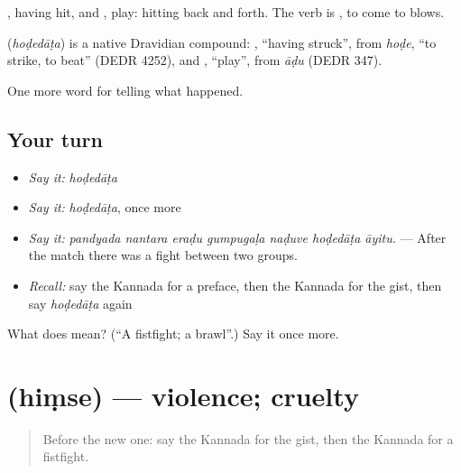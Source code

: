 , having hit, and , play: hitting back and forth. The verb is , to come to blows.

\begin{cousinweb}
\textbf{} (\emph{hoḍedāṭa}) is a native Dravidian compound: , \textquotedblleft{}having struck\textquotedblright{}, from \emph{hoḍe}, \textquotedblleft{}to strike, to beat\textquotedblright{} (DEDR 4252), and , \textquotedblleft{}play\textquotedblright{}, from \emph{āḍu} (DEDR 347).
\end{cousinweb}

\begin{grammarlens}[title={What you've built}]
One more word for telling what happened.
\end{grammarlens}

\subsection*{Your turn}
\begin{itemize}
\raggedright
  \item \emph{Say it:} \emph{hoḍedāṭa}
  \item \emph{Say it:} \emph{hoḍedāṭa}, once more
  \item \emph{Say it:} \emph{pandyada nantara eraḍu gumpugaḷa naḍuve hoḍedāṭa āyitu.} — After the match there was a fight between two groups.
  \item \emph{Recall:} say the Kannada for a preface, then the Kannada for the gist, then say \emph{hoḍedāṭa} again
\end{itemize}

\begin{tcolorbox}[breakable,colback=teal!4,colframe=teal!35!black,title={Before you move on}]
What does  mean? (\textquotedblleft{}A fistfight; a brawl\textquotedblright{}.) Say it once more.
\end{tcolorbox}
\section[\texorpdfstring{\kn{ಹಿಂಸೆ} (hiṃse)}{ಹಿಂಸೆ (hiṃse)}]{ (hiṃse) — violence; cruelty}

\label{lesson:KA-C365-himse}



\begin{quote}
Before the new one: say the Kannada for the gist, then the Kannada for a fistfight.
\end{quote}

